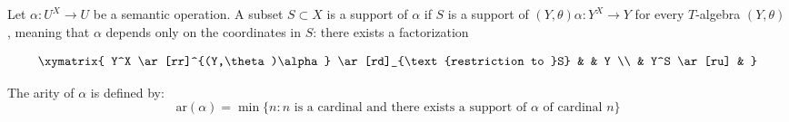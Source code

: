 Let $\alpha: U^X \longrightarrow U$ be a semantic operation. A subset $S \subset X$ is a support of $\alpha$ if $S$ is a support of $(Y, \theta)\alpha: Y^X \longrightarrow Y$ for every $T$-algebra $(Y, \theta)$, meaning that $\alpha$ depends only on the coordinates in $S$: there exists a factorization

$$\xymatrix{
Y^X \ar[rr]^{(Y,\theta)\alpha} \ar[rd]_{\text{restriction to }S} & & Y \\
& Y^S \ar[ru] &
}$$

The arity of $\alpha$ is defined by:
$$\mathrm{ar}(\alpha) = \min\{ n : n \text{ is a cardinal and there exists a support of } \alpha \text{ of cardinal } n \}$$
